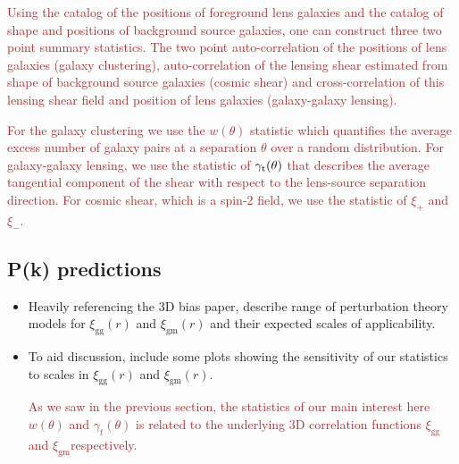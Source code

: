 \documentclass[fleqn,usenatbib]{mnras}
\newcommand{\gammat}{\ensuremath{\gamma_{t}(\theta)} }
\newcommand{\xigg}{\ensuremath{\xi_{\mathrm{gg}}}}
\newcommand{\xigm}{\ensuremath{\xi_{\mathrm{gm}}}}
\newcommand{\brown}[1]{\textcolor{brown}{#1}}
\begin{document}
\brown{Using the catalog of the positions of foreground lens galaxies and the catalog of shape and positions of background source galaxies, one can construct three two point summary statistics. The two point auto-correlation of the positions of lens galaxies (galaxy clustering), auto-correlation of the lensing shear estimated from shape of background source galaxies (cosmic shear) and  cross-correlation of this lensing shear field and position of lens galaxies (galaxy-galaxy lensing). 

For the galaxy clustering we use the $w(\theta)$ statistic which quantifies the average excess number of galaxy pairs at a separation $\theta$ over a random distribution. For galaxy-galaxy lensing, we use the statistic of $\gamma_{\rm t}(\theta)$ that describes the average tangential component of the shear with respect to the lens-source separation direction. For cosmic shear, which is a spin-2 field, we use the statistic of $\xi_{+}$ and $\xi_{-}$. }


\subsection{P(k) predictions}
\label{sec:Pk_pred}
\begin{itemize}
    \item Heavily referencing the 3D bias paper, describe range of perturbation theory models for $\xigg(r)$ and $\xigm(r)$ and their expected scales of applicability. 
    \item To aid discussion, include some plots showing the sensitivity of our statistics to scales in $\xigg(r)$ and $\xigm(r)$.
    
    \brown{As we saw in the previous section, the statistics of our main interest here $w(\theta)$ and $\gammat$ is related to the underlying 3D correlation functions \xigg and \xigm respectively. }
    
\end{itemize}
\end{document}
